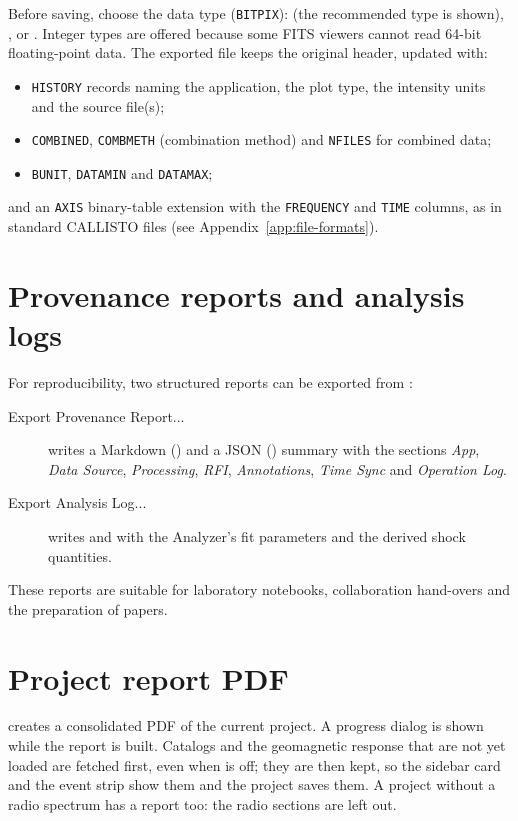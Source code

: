 Before saving, choose the data type (\texttt{BITPIX}):  (the recommended type is
shown), ,  or .
Integer types are offered because some FITS viewers cannot read 64-bit floating-point data.
The exported file keeps the original header, updated with:
\begin{itemize}
  \item \texttt{HISTORY} records naming the application, the plot type, the intensity
    units and the source file(s);
  \item \texttt{COMBINED}, \texttt{COMBMETH} (combination method) and \texttt{NFILES} for
    combined data;
  \item \texttt{BUNIT}, \texttt{DATAMIN} and \texttt{DATAMAX};
\end{itemize}
and an \texttt{AXIS} binary-table extension with the \texttt{FREQUENCY} and \texttt{TIME}
columns, as in standard CALLISTO files (see Appendix~\ref{app:file-formats}).

\section{Provenance reports and analysis logs}
\label{sec:provenance}

For reproducibility, two structured reports can be exported from :
\begin{description}
  \item[Export Provenance Report...] writes a Markdown () and a JSON
    () summary with the sections \emph{App}, \emph{Data Source},
    \emph{Processing}, \emph{RFI}, \emph{Annotations}, \emph{Time Sync} and
    \emph{Operation Log}.
  \item[Export Analysis Log...] writes  and
     with the Analyzer's fit parameters and the derived shock
    quantities.
\end{description}
These reports are suitable for laboratory notebooks, collaboration hand-overs and the
preparation of papers.

\section{Project report PDF}
\label{sec:project-report}

 creates a consolidated PDF of the current project.
A progress dialog is shown while the report is built. Catalogs and the geomagnetic response
that are not yet loaded are fetched first, even when  is off; they are then kept, so the sidebar card and the event strip show them
and the project saves them. A project without a radio spectrum has a report too: the radio
sections are left out.


